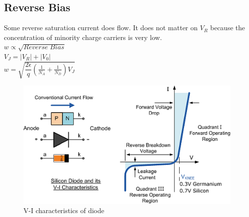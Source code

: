 \documentclass[10pt, a4paper]{report}
\begin{document}
	\subsection{Reverse Bias}
	Some reverse saturation current does flow. It does not matter on $ V_R $ because the concentration of minority charge carriers is very low. \\
	$ w \propto \sqrt{Reverse \; Bias} $ \\
	$ V_J = |V_{R}| +| V_0 |$ \\
	$ w = \sqrt{\dfrac{2\epsilon}{q}(\frac{1}{N_A} + \frac{1}{N_D}) V_J} $
	\begin{figure}[h!]
		\centering
		\includegraphics[width=0.7\linewidth]{img/vi-characteristics}
		\caption{V-I characteristics of diode}
		\label{fig:vi-characteristics}
	\end{figure}
	
\end{document}
